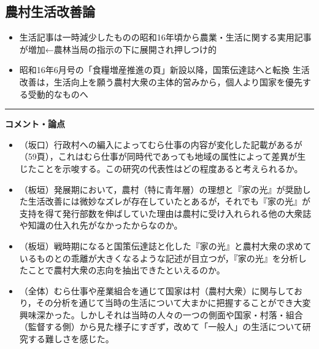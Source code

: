 \documentclass[11pt,autodetect-engine]{jsarticle}%
\begin{document}
 \subsection{農村生活改善論 }
 
 \begin{itemize}
  \item 生活記事は一時減少したものの昭和16年頃から農業・生活に関する実用記事が増加←農林当局の指示の下に展開され押しつけ的
  \item 昭和16年6月号の「食糧増産推進の頁」新設以降，国策伝達誌へと転換
  生活改善は，生活向上を願う農村大衆の主体的営みから，個人より国家を優先する受動的なものへ
\end{itemize}


\noindent \rule{\textwidth}{0.2mm} 
{\bf 
\Large コメント・論点}
\begin{itemize}
  \item （坂口）行政村への編入によってむら仕事の内容が変化した記載があるが（59頁），これはむら仕事が同時代であっても地域の属性によって差異が生じたことを示唆する。この研究の代表性はどの程度あると考えられるか。
  \item （板垣）発展期において，農村（特に青年層）の理想と『家の光』が奨励した生活改善には微妙なズレが存在していたとあるが，それでも『家の光』が支持を得て発行部数を伸ばしていた理由は農村に受け入れられる他の大衆誌や知識の仕入れ先がなかったからなのか。
  \item （板垣）戦時期になると国策伝達誌と化した『家の光』と農村大衆の求めているものとの乖離が大きくなるような記述が目立つが，『家の光』を分析したことで農村大衆の志向を抽出できたといえるのか。
  \item （全体）むら仕事や産業組合を通じて国家は村（農村大衆）に関与しており，その分析を通じて当時の生活について大まかに把握することができ大変興味深かった。しかしそれは当時の人々の一つの側面や国家・村落・組合（監督する側）から見た様子にすぎず，改めて「一般人」の生活について研究する難しさを感じた。
\end{itemize}
\end{document}
